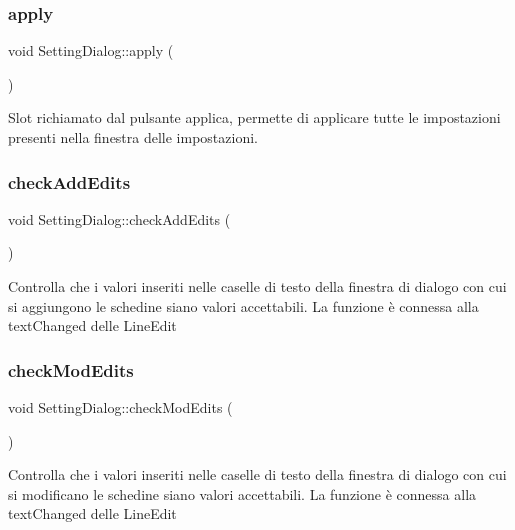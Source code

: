 \subsubsection{\texorpdfstring{apply}{apply}}
{\footnotesize\ttfamily void Setting\+Dialog\+::apply (\begin{DoxyParamCaption}{ }\end{DoxyParamCaption})\hspace{0.3cm}{\ttfamily [slot]}}

Slot richiamato dal pulsante applica, permette di applicare tutte le impostazioni presenti nella finestra delle impostazioni. \mbox{\label{class_setting_dialog_aab115d0e77480b817fdfcd59a9a3652f}} 
\subsubsection{\texorpdfstring{check\+Add\+Edits}{checkAddEdits}}
{\footnotesize\ttfamily void Setting\+Dialog\+::check\+Add\+Edits (\begin{DoxyParamCaption}{ }\end{DoxyParamCaption})\hspace{0.3cm}{\ttfamily [slot]}}

Controlla che i valori inseriti nelle caselle di testo della finestra di dialogo con cui si aggiungono le schedine siano valori accettabili. La funzione è connessa alla {\ttfamily text\+Changed} delle Line\+Edit \mbox{\label{class_setting_dialog_aff7ed5a09e49070b13028568b8dd2d0a}} 
\subsubsection{\texorpdfstring{check\+Mod\+Edits}{checkModEdits}}
{\footnotesize\ttfamily void Setting\+Dialog\+::check\+Mod\+Edits (\begin{DoxyParamCaption}{ }\end{DoxyParamCaption})\hspace{0.3cm}{\ttfamily [slot]}}

Controlla che i valori inseriti nelle caselle di testo della finestra di dialogo con cui si modificano le schedine siano valori accettabili. La funzione è connessa alla {\ttfamily text\+Changed} delle Line\+Edit \mbox{\label{class_setting_dialog_a21152ee14a4412e240920da5b633507f}} 
